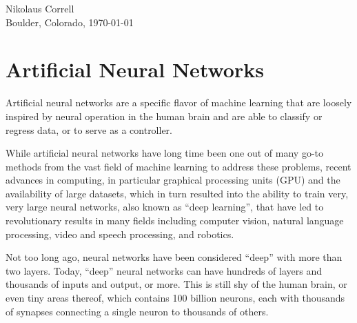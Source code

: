 \documentclass[paper=6.14in:9.21in,pagesize=pdftex,11pt,twoside,openright]{scrbook}
\begin{document}
\begin{flushright}
Nikolaus Correll\\
Boulder, Colorado, \today
\end{flushright}

%
%
%
%
%
%
%
%
%
%
%
%
%
%
%

\chapter{Artificial Neural Networks}
Artificial neural networks are a specific flavor of machine learning that are loosely inspired by neural operation in the human brain and are able to classify or regress data, or to serve as a controller.

While artificial neural networks have long time been one out of many go-to methods from the vast field of machine learning to address these problems, recent advances in computing, in particular graphical processing units (GPU) and the availability of large datasets, which in turn resulted into the ability to train very, very large neural networks, also known as ``deep learning'', that have led to revolutionary results in many fields including computer vision, natural language processing, video and speech processing, and robotics.

Not too long ago, neural networks have been considered ``deep'' with more than two layers. Today, ``deep'' neural networks can have hundreds of layers and thousands of inputs and output, or more. This is still shy of the human brain, or even tiny areas thereof, which contains 100 billion neurons, each with thousands of synapses connecting a single neuron to thousands of others.
\end{document}

